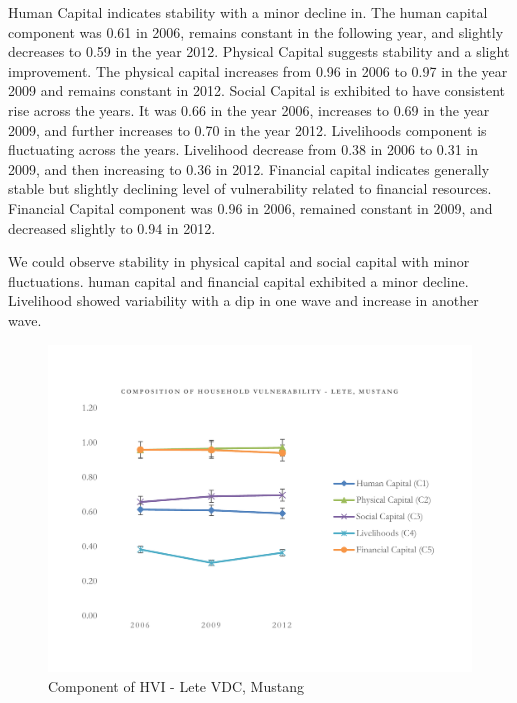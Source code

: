 Human Capital indicates stability with a minor decline in. The human capital component was 0.61 in 2006, remains constant in the following year, and slightly decreases to 0.59 in the year 2012. Physical Capital suggests stability and a slight improvement. The physical capital increases from 0.96 in 2006 to 0.97 in the year 2009 and remains constant in 2012. Social Capital is exhibited to have consistent rise across the years. It was 0.66 in the year 2006, increases to 0.69 in the year 2009, and further increases to 0.70 in the year 2012. Livelihoods component is fluctuating across the years. Livelihood decrease from 0.38 in 2006 to 0.31 in 2009, and then increasing to 0.36 in 2012. Financial capital indicates generally stable but slightly declining level of vulnerability related to financial resources. Financial Capital component was 0.96 in 2006, remained constant in 2009, and decreased slightly to 0.94 in 2012.\par  

We could observe stability in physical capital and social capital with minor fluctuations. human capital and financial capital exhibited a minor decline. Livelihood showed variability with a dip in one wave and increase in another wave.\par  

\begin{figure}[htb]
	\includegraphics[scale=0.6]{figure/HVI_Component_Lete_line.pdf}
	\caption{Component of HVI - Lete VDC, Mustang}
	\setlength{\abovecaptionskip}{1pt}
	\label{fig:hviletecomponents}
\end{figure}

